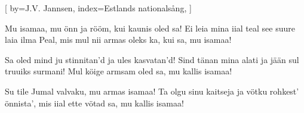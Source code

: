 

[
by={J.V. Jannsen},
index={Estlands nationalsång},
]

\beginverse*
Mu isamaa, mu önn ja rööm,
kui kaunis oled sa!
Ei leia mina iial teal
see suure laia ilma Peal,
mis mul nii armas oleks ka,
kui sa, mu isamaa!
\endverse

\beginverse*
Sa oled mind ju stinnitan'd
ja ules kasvatan'd!
Sind tänan mina alati
ja jään sul truuiks surmani!
Mul köige armsam oled sa,
mu kallis isamaa!
\endverse

\beginverse*
Su tile Jumal valvaku,
mu armas isamaa!
Ta olgu sinu kaitseja
ja vötku rohkest' önnista',
mis iial ette vötad sa,
mu kallis isamaa!
\endverse
\endsong


